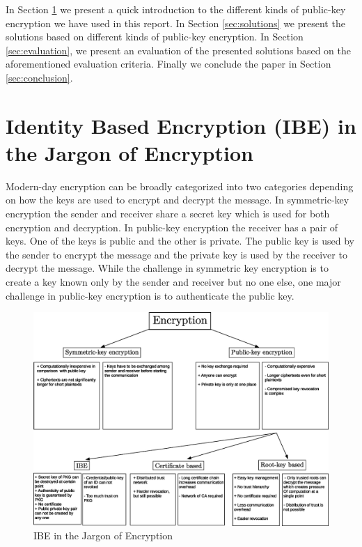 \documentclass[12pt]{llncs}
\begin{document}
In Section \ref{sec:id_based_crypto} we present a quick introduction to the different kinds of public-key encryption we have used in this report. In Section \ref{sec:solutions} we present the solutions based on different kinds of public-key encryption. In Section \ref{sec:evaluation}, we present an evaluation of the presented solutions based on the aforementioned evaluation criteria. Finally we conclude the paper in Section \ref{sec:conclusion}.

\section{Identity Based Encryption (IBE) in the Jargon of Encryption} \label{sec:id_based_crypto}
Modern-day encryption can be broadly categorized into two categories depending on how the keys are used to encrypt and decrypt the message. In symmetric-key encryption the sender and receiver share a secret key which is used for both encryption and decryption. In public-key encryption the receiver has a pair of keys. One of the keys is public and the other is private. The public key is used by the sender to encrypt the message and the private key is used by the receiver to decrypt the message. While the challenge in symmetric key encryption is to create a key known only by the sender and receiver but no one else, one major challenge in public-key encryption is to authenticate the public key.
\begin{figure}
\begin{center}
  \includegraphics[width=.98\textwidth]{ibc_in_jargon_of_crypto.eps}
\caption{IBE in the Jargon of Encryption}
\label{fig:ibe_in_the_jargon_of_cryptography}       %
\end{center}
\end{figure}
\end{document}
